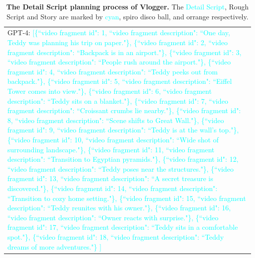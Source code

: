 \begin{table}[h!]
\begin{minipage}{0.98\linewidth}
\begin{tcolorbox}
\begin{tabular}{p{0.99\linewidth}}
\begin{minipage}{0.99\linewidth}
GPT-4: \textcolor{cyan}{[\{``video fragment id": 1, ``video fragment description": ``One day, Teddy was planning his trip on paper."\}, \{``video fragment id": 2, ``video fragment description": ``Backpack is in an airport."\}, \{``video fragment id": 3, ``video fragment description": ``People rush around the airport."\}, \{``video fragment id": 4, ``video fragment description": ``Teddy peeks out from backpack."\}, \{``video fragment id": 5, ``video fragment description": ``Eiffel Tower comes into view."\}, \{``video fragment id": 6, ``video fragment description": ``Teddy sits on a blanket."\}, \{``video fragment id": 7, ``video fragment description": ``Croissant crumbs lie nearby."\}, \{``video fragment id": 8, ``video fragment description": ``Scene shifts to Great Wall."\}, \{``video fragment id": 9, ``video fragment description": ``Teddy is at the wall's top."\}, \{``video fragment id": 10, ``video fragment description": ``Wide shot of surrounding landscape."\}, \{``video fragment id": 11, ``video fragment description": ``Transition to Egyptian pyramids."\}, \{``video fragment id": 12, ``video fragment description": ``Teddy poses near the structures."\}, \{``video fragment id": 13, ``video fragment description": ``A secret treasure is discovered."\}, \{``video fragment id": 14, ``video fragment description": ``Transition to cozy home setting."\}, \{``video fragment id": 15, ``video fragment description": ``Teddy reunites with his owner."\}, \{``video fragment id": 16, ``video fragment description": ``Owner reacts with surprise."\}, \{``video fragment id": 17, ``video fragment description": ``Teddy sits in a comfortable spot."\}, \{``video fragment id": 18, ``video fragment description": ``Teddy dreams of more adventures."\}
]
}
 \end{minipage}
        \end{tabular}
    \end{tcolorbox}
    \vspace{-2mm}
    \caption{\textbf{The Detail Script planning process of Vlogger.} The \textcolor{cyan}{Detail Script}, \textcolor[RGB]{37, 204, 247}{Rough Script} and \textcolor[RGB]{243, 156, 18}{Story} are marked by \textcolor{cyan}{cyan}, \textcolor[RGB]{37, 204, 247}{spiro disco ball}, and \textcolor[RGB]{243, 156, 18}{orrange} respectively.
    }
    \label{tab:instruction_2}
\end{minipage}
\end{table}